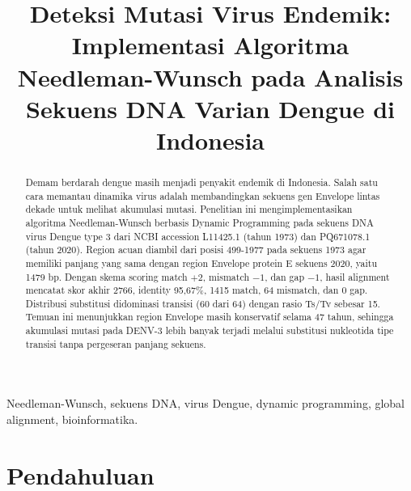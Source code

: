 \documentclass[conference]{IEEEtran}
\begin{document}
\title{Deteksi Mutasi Virus Endemik: Implementasi Algoritma Needleman-Wunsch pada Analisis Sekuens DNA Varian Dengue di Indonesia}

\author{
}

\maketitle

\begin{abstract}
Demam berdarah dengue masih menjadi penyakit endemik di Indonesia. Salah satu cara memantau dinamika virus adalah membandingkan sekuens gen Envelope lintas dekade untuk melihat akumulasi mutasi. Penelitian ini mengimplementasikan algoritma Needleman-Wunsch berbasis Dynamic Programming pada sekuens DNA virus Dengue type 3 dari NCBI accession L11425.1 (tahun 1973) dan PQ671078.1 (tahun 2020). Region acuan diambil dari posisi 499-1977 pada sekuens 1973 agar memiliki panjang yang sama dengan region Envelope protein E sekuens 2020, yaitu 1479 bp. Dengan skema scoring match $+2$, mismatch $-1$, dan gap $-1$, hasil alignment mencatat skor akhir 2766, identity 95,67\%, 1415 match, 64 mismatch, dan 0 gap. Distribusi substitusi didominasi transisi (60 dari 64) dengan rasio Ts/Tv sebesar 15. Temuan ini menunjukkan region Envelope masih konservatif selama 47 tahun, sehingga akumulasi mutasi pada DENV-3 lebih banyak terjadi melalui substitusi nukleotida tipe transisi tanpa pergeseran panjang sekuens.
\end{abstract}

\begin{IEEEkeywords}
Needleman-Wunsch, sekuens DNA, virus Dengue, dynamic programming, global alignment, bioinformatika.
\end{IEEEkeywords}

\section{Pendahuluan}
\end{document}
